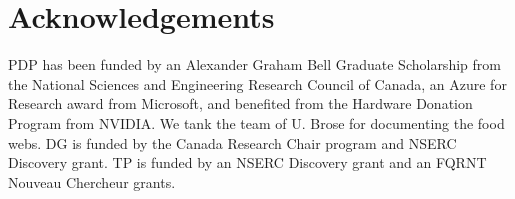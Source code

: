 \documentclass[letterpaper]{article}
\begin{document}
\section{Acknowledgements}

PDP has been funded by an Alexander Graham Bell Graduate Scholarship from the
National Sciences and Engineering Research Council of Canada, an Azure for
Research award from Microsoft, and benefited from the Hardware Donation Program
from NVIDIA. We tank the team of U. Brose for documenting the food webs. DG is
funded by the Canada Research Chair program and NSERC Discovery grant. TP is
funded by an NSERC Discovery grant and an FQRNT Nouveau Chercheur grants.



\end{document}
